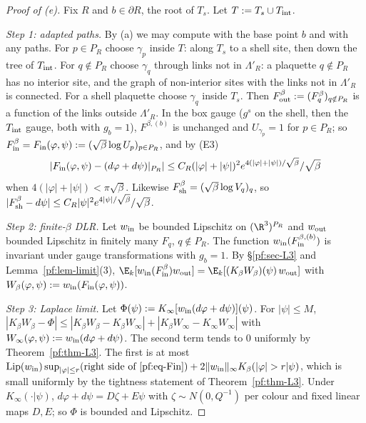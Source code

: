 \begin{proof}[Proof of (e)]
Fix $R$ and $b\in\partial R$, the root of $T_s$. Let $T:=T_s\cup T_{\rm int}$.

\emph{Step 1: adapted paths.} By (a) we may compute with the base point $b$ and with any paths. For $p\in P_R$ choose $\gamma_p$ inside $T$: along $T_s$ to a shell site, then down the tree of $T_{\rm int}$. For $q\notin P_R$ choose $\gamma_q$ through links not in $\Lambda'_R$: a plaquette $q\notin P_R$ has no interior site, and the graph of non-interior sites with the links not in $\Lambda'_R$ is connected. For a shell plaquette choose $\gamma_q$ inside $T_s$. Then $F^\beta_{\rm out}:=(F^\beta_q)_{q\notin P_R}$ is a function of the links outside $\Lambda'_R$. In the box gauge ($g^s$ on the shell, then the $T_{\rm int}$ gauge, both with $g_b=1$), $F^{\beta,(b)}$ is unchanged and $U_{\gamma_p}=1$ for $p\in P_R$; so $F^\beta_{\rm in}=F_{\rm in}(\varphi,\psi):=(\sqrt\beta\log U_p)_{p\in P_R}$, and by (E3)
\begin{equation}\label{pf:eq-Fin}
|F_{\rm in}(\varphi,\psi)-(d\varphi+d\psi)|_{P_R}|\le C_R(|\varphi|+|\psi|)^2e^{4(|\varphi|+|\psi|)/\sqrt\beta}/\sqrt\beta
\end{equation}
when $4(|\varphi|+|\psi|)<\pi\sqrt\beta$. Likewise $F^\beta_{\rm sh}=(\sqrt\beta\log V_q)_q$, so $|F^\beta_{\rm sh}-d\psi|\le C_R|\psi|^2e^{4|\psi|/\sqrt\beta}/\sqrt\beta$.

\emph{Step 2: finite-$\beta$ DLR.} Let $w_{\rm in}$ be bounded Lipschitz on $(\R^3)^{P_R}$ and $w_{\rm out}$ bounded Lipschitz in finitely many $F_q$, $q\notin P_R$. The function $w_{\rm in}(F^{\beta,(b)}_{\rm in})$ is invariant under gauge transformations with $g_b=1$. By \S\ref{pf:sec-L3} and Lemma~\ref{pf:lem-limit}(3),
$\E_k[w_{\rm in}(F^\beta_{\rm in})w_{\rm out}]=\E_k[(K_\beta W_\beta)(\psi)\,w_{\rm out}]$ with $W_\beta(\varphi,\psi):=w_{\rm in}(F_{\rm in}(\varphi,\psi))$.

\emph{Step 3: Laplace limit.} Let $\Phi(\psi):=K_\infty[w_{\rm in}(d\varphi+d\psi)](\psi)$. For $|\psi|\le M$,
$|K_\beta W_\beta-\Phi|\le|K_\beta W_\beta-K_\beta W_\infty|+|K_\beta W_\infty-K_\infty W_\infty|$ with $W_\infty(\varphi,\psi):=w_{\rm in}(d\varphi+d\psi)$. The second term tends to $0$ uniformly by Theorem~\ref{pf:thm-L3}. The first is at most $\mathrm{Lip}(w_{\rm in})\sup_{|\varphi|\le r}(\text{right side of }\eqref{pf:eq-Fin})+2\|w_{\rm in}\|_\infty K_\beta(|\varphi|>r|\psi)$, which is small uniformly by the tightness statement of Theorem~\ref{pf:thm-L3}. Under $K_\infty(\cdot|\psi)$, $d\varphi+d\psi=D\zeta+E\psi$ with $\zeta\sim N(0,Q^{-1})$ per colour and fixed linear maps $D,E$; so $\Phi$ is bounded and Lipschitz.


\end{proof}
